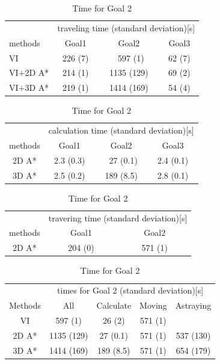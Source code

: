 \begin{table}[htb]
    \centering
    \caption{Result with the Map of Outdoor Environment}
    \label{tab:result}
    \begin{tabular}{l|ccc}
        \hline
	    & \multicolumn{3}{c}{traveling time (standard deviation)[s]} \\
            methods & Goal1 & Goal2 & Goal3 \\
        \hline
            VI & 226 (7) & \, 597 (1)\phantom{00}  & 62 (7) \\
	    VI$+$2D A* & 214 (1) & 1135 (129) & 69 (2) \\
            VI$+$3D A* & 219 (1) & 1414 (169) & 54 (4) \\
        \hline
    \end{tabular}
    \centering
    \caption{Calculation Time for Temporal Path}
    \label{tab:result_calc}
    \begin{tabular}{c|ccc}
        \hline
	    & \multicolumn{3}{c}{calculation time (standard deviation)[s]} \\
            methods & Goal1 & Goal2 & Goal3 \\
        \hline
	    2D A* & 2.3 (0.3) & \ 27 (0.1) & 2.4 (0.1) \\
            3D A* & 2.5 (0.2) & 189 (8.5) & 2.8 (0.1) \\
        \hline
    \end{tabular}
    \centering
    \caption{Travering Time for Temporal Path}
    \label{tab:result_track}
    \begin{tabular}{c|cc}
        \hline
	    & \multicolumn{2}{c}{travering time (standard deviation)[s]} \\
            methods & Goal1 & Goal2  \\
        \hline
            2D A* & 204 (0) & 571 (1)  \\
        \hline
    \end{tabular}
    \centering
    \caption{Time for Goal 2}
    \label{tab:result_g2}
    \begin{tabular}{c|cccc}
        \hline
	    & \multicolumn{4}{c}{times for Goal 2 (standard deviation)[s]} \\
            Methods & All & Calculate & Moving & Astraying \\
        \hline
            VI & 597 (1) & 26 (2) & 571 (1) & \\
            2D A* & 1135 (129) & 27 (0.1)  & 571 (1) & 537 (130) \\
            3D A* & 1414 (169) & 189 (8.5) & 571 (1) & 654 (179) \\
        \hline
    \end{tabular}
\end{table}




